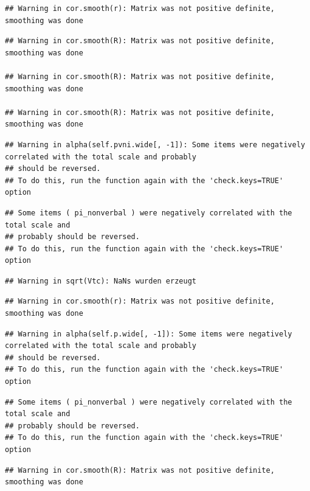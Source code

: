 \documentclass[
  english,
  man,floatsintext]{apa6}
\begin{document}
\begin{verbatim}
## Warning in cor.smooth(r): Matrix was not positive definite, smoothing was done
\end{verbatim}

\begin{verbatim}
## Warning in cor.smooth(R): Matrix was not positive definite, smoothing was done

## Warning in cor.smooth(R): Matrix was not positive definite, smoothing was done

## Warning in cor.smooth(R): Matrix was not positive definite, smoothing was done
\end{verbatim}

\begin{verbatim}
## Warning in alpha(self.pvni.wide[, -1]): Some items were negatively correlated with the total scale and probably 
## should be reversed.  
## To do this, run the function again with the 'check.keys=TRUE' option
\end{verbatim}

\begin{verbatim}
## Some items ( pi_nonverbal ) were negatively correlated with the total scale and 
## probably should be reversed.  
## To do this, run the function again with the 'check.keys=TRUE' option
\end{verbatim}

\begin{verbatim}
## Warning in sqrt(Vtc): NaNs wurden erzeugt
\end{verbatim}

\begin{verbatim}
## Warning in cor.smooth(r): Matrix was not positive definite, smoothing was done
\end{verbatim}

\begin{verbatim}
## Warning in alpha(self.p.wide[, -1]): Some items were negatively correlated with the total scale and probably 
## should be reversed.  
## To do this, run the function again with the 'check.keys=TRUE' option
\end{verbatim}

\begin{verbatim}
## Some items ( pi_nonverbal ) were negatively correlated with the total scale and 
## probably should be reversed.  
## To do this, run the function again with the 'check.keys=TRUE' option
\end{verbatim}

\begin{verbatim}
## Warning in cor.smooth(R): Matrix was not positive definite, smoothing was done
\end{verbatim}
\end{document}
